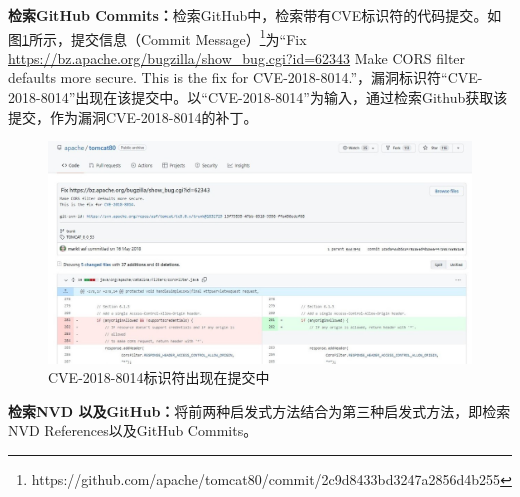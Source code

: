 \textbf{检索GitHub Commits：}检索GitHub中，检索带有CVE标识符的代码提交\cite{you2017semfuzz,Wang2020empirical}。如图\ref{fig:commitmessage}所示，提交信息（Commit Message）\footnote{https://github.com/apache/tomcat80/commit/2c9d8433bd3247a2856d4b255}为“Fix \url{https://bz.apache.org/bugzilla/show_bug.cgi?id=62343} Make CORS filter defaults more secure. This is the fix for CVE-2018-8014.”，漏洞标识符“CVE-2018-8014”出现在该提交中。以“CVE-2018-8014”为输入，通过检索Github获取该提交，作为漏洞CVE-2018-8014的补丁。
\begin{figure}[h]
    \centering
    \includegraphics[scale=0.45]{fig/CVE in commit message.jpg}
    \caption{CVE-2018-8014标识符出现在提交中}\label{fig:commitmessage}
\end{figure}

\textbf{检索NVD 以及GitHub：}将前两种启发式方法结合为第三种启发式方法，即检索NVD References以及GitHub Commits。


